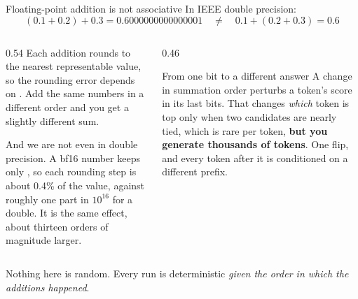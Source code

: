 \documentclass[aspectratio=169,10pt]{beamer}
\begin{document}
\begin{frame}[shrink=5]{Floating-point addition is not associative}
  In IEEE double precision:
  \[
    (0.1 + 0.2) + 0.3 = 0.6000000000000001
    \quad\neq\quad
    0.1 + (0.2 + 0.3) = 0.6
  \]
  \vspace{-0.4em}
  \begin{columns}[T]
    \begin{column}{0.54\textwidth}
      Each addition rounds to the nearest representable value, so the rounding
      error depends on . Add the same numbers
      in a different order and you get a slightly different sum.
      \vspace{0.5em}

      And we are not even in double precision. A bf16 number keeps only
      , so each rounding step is about 0.4\% of the
      value, against roughly one part in $10^{16}$ for a double. It is the
      same effect, about thirteen orders of magnitude larger.
    \end{column}
    \begin{column}{0.46\textwidth}
      \begin{block}{From one bit to a different answer}
        \small
        A change in summation order perturbs a token's score in its last bits.
        \vspace{0.3em}
        That changes \emph{which} token is top only when two candidates are
        nearly tied, which is rare per token, \textbf{but you generate
        thousands of tokens}.
        \vspace{0.3em}
        One flip, and every token after it is conditioned on a different
        prefix. 
      \end{block}
    \end{column}
  \end{columns}
  \vspace{0.3em}
  \centering
  \small
  Nothing here is random. Every run is deterministic \emph{given the order in
  which the additions happened}.
\end{frame}
\end{document}
